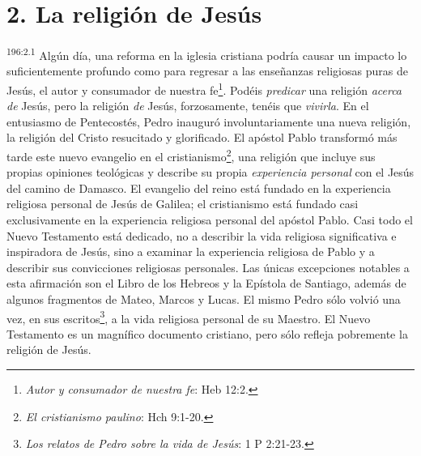 \section*{2. La religión de Jesús}
\par
\textsuperscript{196:2.1} Algún día, una reforma en la iglesia cristiana podría causar un impacto lo suficientemente profundo como para regresar a las enseñanzas religiosas puras de Jesús, el autor y consumador de nuestra fe\footnote{\textit{Autor y consumador de nuestra fe}: Heb 12:2.}. Podéis \textit{predicar} una religión \textit{acerca de} Jesús, pero la religión \textit{de} Jesús, forzosamente, tenéis que \textit{vivirla}. En el entusiasmo de Pentecostés, Pedro inauguró involuntariamente una nueva religión, la religión del Cristo resucitado y glorificado. El apóstol Pablo transformó más tarde este nuevo evangelio en el cristianismo\footnote{\textit{El cristianismo paulino}: Hch 9:1-20.}, una religión que incluye sus propias opiniones teológicas y describe su propia \textit{experiencia personal} con el Jesús del camino de Damasco. El evangelio del reino está fundado en la experiencia religiosa personal de Jesús de Galilea; el cristianismo está fundado casi exclusivamente en la experiencia religiosa personal del apóstol Pablo. Casi todo el Nuevo Testamento está dedicado, no a describir la vida religiosa significativa e inspiradora de Jesús, sino a examinar la experiencia religiosa de Pablo y a describir sus convicciones religiosas personales. Las únicas excepciones notables a esta afirmación son el Libro de los Hebreos y la Epístola de Santiago, además de algunos fragmentos de Mateo, Marcos y Lucas. El mismo Pedro sólo volvió una vez, en sus escritos\footnote{\textit{Los relatos de Pedro sobre la vida de Jesús}: 1 P 2:21-23.}, a la vida religiosa personal de su Maestro. El Nuevo Testamento es un magnífico documento cristiano, pero sólo refleja pobremente la religión de Jesús.

